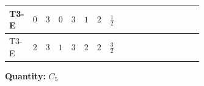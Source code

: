 \documentclass[8pt]{article}
\begin{document}
\begin{landscape}
\begin{longtable}{@{}llcccccc >{\raggedright\arraybackslash}p{0.21\linewidth} >{\raggedright\arraybackslash}p{0.21\linewidth} >{\raggedright\arraybackslash}p{0.21\linewidth}@{}}
\midrule
T3-E & $0$ & $3$ & $0$ & $3$ & $1$ & $2$ & $\frac{1}{2}$ & \scriptsize\adjustbox{max width=\linewidth}{$\begin{gathered} - 3 C_{5} g_{2}^{2}\end{gathered}$} & \scriptsize\adjustbox{max width=\linewidth}{$\begin{gathered} 2 C_{5} \lambda_1\end{gathered}$} & \scriptsize\adjustbox{max width=\linewidth}{$\begin{gathered} - C_{5} Y_e Y_e^\dagger\end{gathered}$} \\
\midrule
T3-E & $2$ & $3$ & $1$ & $3$ & $2$ & $2$ & $\frac{3}{2}$ & \scriptsize\adjustbox{max width=\linewidth}{$\begin{gathered} - 3 C_{5} g_{2}^{2}\end{gathered}$} & \scriptsize\adjustbox{max width=\linewidth}{$\begin{gathered} 2 C_{5} \lambda_1\end{gathered}$} & \scriptsize\adjustbox{max width=\linewidth}{$\begin{gathered} - C_{5} Y_e Y_e^\dagger\end{gathered}$} \\
\midrule
\bottomrule
\end{longtable}
\clearpage
\noindent\textbf{Quantity: }$C_5$\par\smallskip

\end{landscape}
\end{document}
